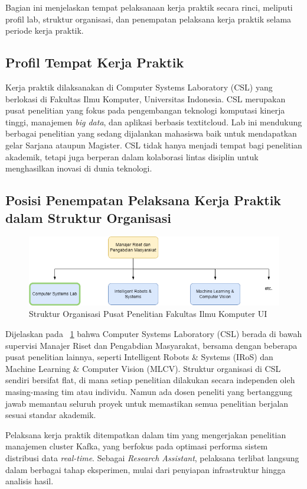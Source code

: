 Bagian ini menjelaskan tempat pelaksanaan kerja praktik secara rinci, meliputi profil lab, struktur organisasi, dan penempatan pelaksana kerja praktik selama periode kerja praktik.

\subsection{Profil Tempat Kerja Praktik}
\label{sec:profil-tempat}

Kerja praktik dilaksanakan di Computer Systems Laboratory (CSL) yang berlokasi di Fakultas Ilmu Komputer, Universitas Indonesia. CSL merupakan pusat penelitian yang fokus pada pengembangan teknologi komputasi kinerja tinggi, manajemen \textit{big data}, dan aplikasi berbasis textit{cloud}. Lab ini mendukung berbagai penelitian yang sedang dijalankan mahasiswa baik untuk mendapatkan gelar Sarjana ataupun Magister. CSL tidak hanya menjadi tempat bagi penelitian akademik, tetapi juga berperan dalam kolaborasi lintas disiplin untuk menghasilkan inovasi di dunia teknologi.

\subsection{Posisi Penempatan Pelaksana Kerja Praktik dalam Struktur Organisasi}
\label{sec:posisi}

\vspace*{0.8cm}

\begin{figure}
	\centering
	\includegraphics[width=1\textwidth]
	{assets/pics/pacil-org.png}
	\caption{Struktur Organisasi Pusat Penelitian Fakultas Ilmu Komputer UI}
	\label{fig:pacil-org}
\end{figure}

Dijelaskan pada \pic~\ref{fig:pacil-org} bahwa Computer Systems Laboratory (CSL) berada di bawah supervisi Manajer Riset dan Pengabdian Masyarakat, bersama dengan beberapa pusat penelitian lainnya, seperti Intelligent Robots \& Systems (IRoS) dan Machine Learning \& Computer Vision (MLCV). Struktur organisasi di CSL sendiri bersifat flat, di mana setiap penelitian dilakukan secara independen oleh masing-masing tim atau individu. Namun ada dosen peneliti yang bertanggung jawab memantau seluruh proyek untuk memastikan semua penelitian berjalan sesuai standar akademik.

Pelaksana kerja praktik ditempatkan dalam tim yang mengerjakan penelitian manajemen cluster Kafka, yang berfokus pada optimasi performa sistem distribusi data \textit{real-time}. Sebagai \textit{Research Assistant}, pelaksana terlibat langsung dalam berbagai tahap eksperimen, mulai dari penyiapan infrastruktur hingga analisis hasil.
